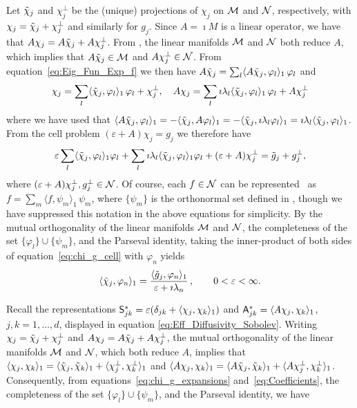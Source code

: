 \documentclass[amsa]{ipart}
\begin{document}
Let $\tilde{\chi}_j$ and $\chi_j^\perp$ be the (unique) projections of $\chi_j$
on $\mathcal{M}$ and $\mathcal{N}$, respectively, with $\chi_j=\tilde{\chi}_j+\chi_j^\perp$ and
similarly for $g_j$. Since $A=\imath M$ is a linear operator, we have that
$A\chi_j=A\tilde{\chi}_j+A\chi_j^\perp$. From , the
linear manifolds $\mathcal{M}$ and $\mathcal{N}$ both reduce $A$, which implies that
$A\tilde{\chi}_j\in\mathcal{M}$ and $A\chi_j^\perp\in\mathcal{N}$. From
equation~\eqref{eq:Eig_Fun_Exp_f} we then have
$A\tilde{\chi}_j=\sum_l\langle A\tilde{\chi}_j,\varphi_l\rangle_1\,\varphi_l$ and       
%
\begin{align}\label{eq:chi_g_expansions}
  \chi_j=\sum_l\langle\chit_j,\varphi_l\rangle_1\,\varphi_l +\chi_j^\perp,
  \quad
  A\chi_j=\sum_l\imath\lambda_l\langle\chit_j,\varphi_l\rangle_1\,\varphi_l +A\chi_j^\perp
\end{align}
%
where we have used that
$\langle A\tilde{\chi}_j,\varphi_l\rangle_1=-\langle\tilde{\chi}_j,A\varphi_l\rangle_1=-\langle\tilde{\chi}_j,\imath \lambda_l\varphi_l\rangle_1=\imath\lambda_l\langle\tilde{\chi}_j,\varphi_l\rangle_1$. From the
cell problem $(\varepsilon+A)\chi_j=g_j$ we therefore have
%
\begin{align}\label{eq:chi_g_cell}
  \varepsilon\sum_l\langle\chit_j,\varphi_l\rangle_1\varphi_l + \sum_l\imath\lambda_l\langle\chit_j,\varphi_l\rangle_1\varphi_l + (\varepsilon+A)\chi_j^\perp=\gt_j+g_j^\perp,
\end{align}
%
where $(\varepsilon+A)\chi_j^\perp,g_j^\perp\in\mathcal{N}$. Of course, each $f\in\mathcal{N}$ can be
represented~\cite{Stone:64} as $f=\sum_m\langle f,\psi_m\rangle_1\,\psi_m$, where $\{\psi_m\}$ is the
orthonormal set defined in , though we
have suppressed this notation in the above equations for
simplicity. By the mutual orthogonality of the linear manifolds
$\mathcal{M}$ and $\mathcal{N}$, the completeness of the set $\{\varphi_l\}\cup\{\psi_m\}$, and the
Parseval identity, taking the inner-product of both sides of
equation~\eqref{eq:chi_g_cell} with $\varphi_n$ yields
%
\begin{align}\label{eq:Coefficients}
  \langle\chit_j,\varphi_n\rangle_1=\frac{\langle\gt_j,\varphi_n\rangle_1}{\varepsilon+\imath\lambda_n}\,,
  \qquad
  0<\varepsilon<\infty.
\end{align}
%




Recall the representations $\mathsf{S}^*_{jk}=\varepsilon(\delta_{jk}+\langle\chi_j,\chi_k\rangle_1)$ and
$\mathsf{A}^*_{jk}=\langle A\chi_j,\chi_k\rangle_1$, $j,k=1,\ldots,d$, displayed in equation 
\eqref{eq:Eff_Diffusivity_Sobolev}. Writing $\chi_j=\tilde{\chi}_j+\chi_j^\perp$ and
$A\chi_j=A\tilde{\chi}_j+A\chi_j^\perp$, the mutual orthogonality of the linear
manifolds $\mathcal{M}$ and $\mathcal{N}$, which both reduce $A$, implies that
$\langle\chi_j,\chi_k\rangle_1=\langle\tilde{\chi}_j,\tilde{\chi}_k\rangle_1+\langle\chi^\perp_j,\chi^\perp_k\rangle_1$ and
$\langle A\chi_j,\chi_k\rangle_1=\langle A\tilde{\chi}_j,\tilde{\chi}_k\rangle_1+\langle A\chi^\perp_j,\chi^\perp_k\rangle_1$. Consequently,
from equations~\eqref{eq:chi_g_expansions}
and~\eqref{eq:Coefficients}, the completeness of the set
$\{\varphi_l\}\cup\{\psi_m\}$, and the Parseval identity, we have  
\end{document}
